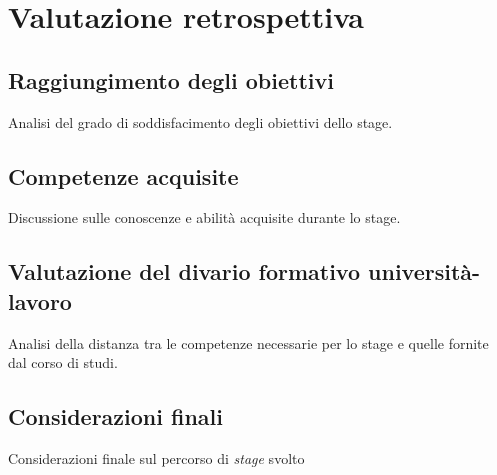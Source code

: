 \chapter{Valutazione retrospettiva}
\label{cap:conclusioni}

\section{Raggiungimento degli obiettivi}
Analisi del grado di soddisfacimento degli obiettivi dello stage.

\section{Competenze acquisite}
Discussione sulle conoscenze e abilità acquisite durante lo stage.

\section{Valutazione del divario formativo università-lavoro}
Analisi della distanza tra le competenze necessarie per lo stage e quelle fornite dal corso di studi.

\section{Considerazioni finali}
Considerazioni finale sul percorso di \textit{stage} svolto

